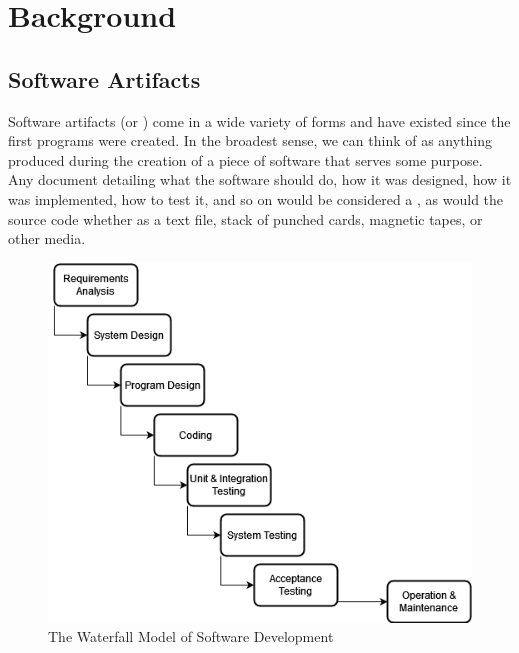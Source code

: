 \chapter{Background}
\section{Software Artifacts}
\label{sec:sfs}

Software artifacts (or \sfs{}) come in a wide variety of forms and have existed 
since the first programs were created. In the broadest sense, we can think of 
\sfs{} as anything produced during the creation of a piece of software that 
serves some purpose. Any document detailing what the software should do, how it 
was designed, how it was implemented, how to test it, and so on would be 
considered a \sf{}, as would the source code whether as a text file, stack of 
punched cards, magnetic tapes, or other media.


\begin{figure}
\includegraphics[width=\linewidth]{figures/Waterfall.png}
\caption{The Waterfall Model of Software Development}
\label{fig:Waterfall}
\end{figure}

